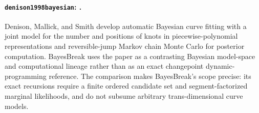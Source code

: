 \paragraph{\texttt{denison1998bayesian}: \citet{denison1998bayesian}.}
Denison, Mallick, and Smith develop automatic Bayesian curve fitting with a joint model for the number and positions of knots in piecewise-polynomial representations and reversible-jump Markov chain Monte Carlo for posterior computation. BayesBreak uses the paper as a contrasting Bayesian model-space and computational lineage rather than as an exact changepoint dynamic-programming reference. The comparison makes BayesBreak's scope precise: its exact recursions require a finite ordered candidate set and segment-factorized marginal likelihoods, and do not subsume arbitrary trans-dimensional curve models.
